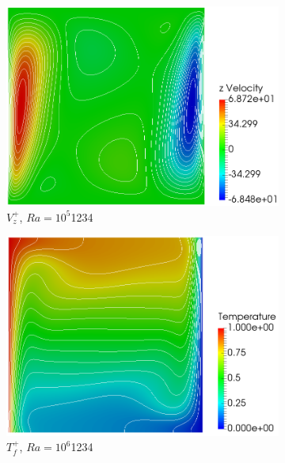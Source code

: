 \begin{figure}[!h]
\begin{subfigure}{0.32\textwidth}
  \includegraphics[width=\linewidth]{figs/Ra5_v.png}
  \caption{\(V_z^+\), \(Ra=10^5\)\color{white}1234}
    \vspace*{0.5em}
\end{subfigure}
\begin{subfigure}{0.32\textwidth}
  \centering
  \includegraphics[width=\linewidth]{figs/Ra6_t.png}
  \caption{\(T_f^+\), \(Ra=10^6\)\color{white}1234}
  \label{fig:Ra6T}
    \vspace*{0.5em}
\end{subfigure}
\begin{subfigure}{0.32\textwidth}
  \centering

\end{subfigure}
\end{figure}
